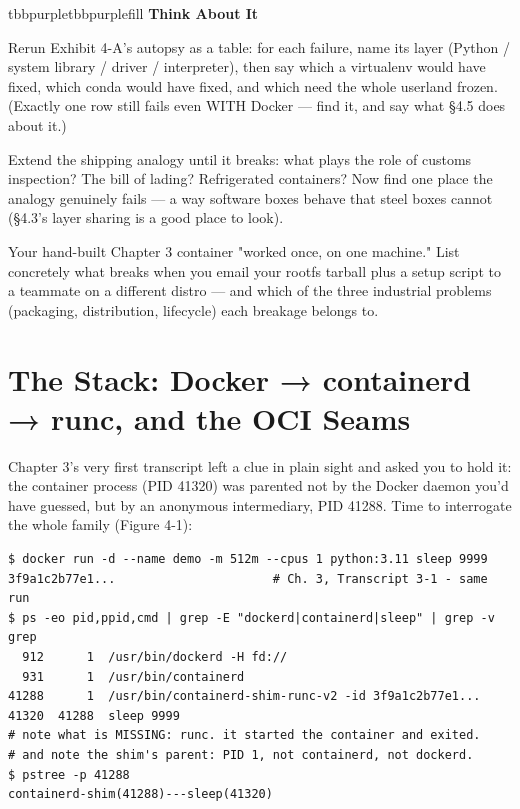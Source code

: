 \begin{calloutbox}{tbbpurple}{tbbpurplefill}
{\normalsize\bfseries\color{tbbpurple}Think About It}\par\vspace{3pt}
\begin{tbbitemize}
  \item Rerun Exhibit 4-A's autopsy as a table: for each failure, name its layer (Python / system library / driver / interpreter), then say which a virtualenv would have fixed, which conda would have fixed, and which need the whole userland frozen. (Exactly one row still fails even WITH Docker — find it, and say what §4.5 does about it.)
  \item Extend the shipping analogy until it breaks: what plays the role of customs inspection? The bill of lading? Refrigerated containers? Now find one place the analogy genuinely fails — a way software boxes behave that steel boxes cannot (§4.3's layer sharing is a good place to look).
  \item Your hand-built Chapter 3 container "worked once, on one machine." List concretely what breaks when you email your rootfs tarball plus a setup script to a teammate on a different distro — and which of the three industrial problems (packaging, distribution, lifecycle) each breakage belongs to.
\end{tbbitemize}
\end{calloutbox}

\section{The Stack: Docker → containerd → runc, and the OCI Seams}

Chapter 3's very first transcript left a clue in plain sight and asked you to hold it: the container process (PID 41320) was parented not by the Docker daemon you'd have guessed, but by an anonymous intermediary, PID 41288. Time to interrogate the whole family (Figure 4-1):

\begin{terminalbox}
\begin{Verbatim}[breaklines=true,breakanywhere=true,fontsize=\small,formatcom=\color{tbbtermfg},codes=\tbbcodeactive]
$ docker run -d --name demo -m 512m --cpus 1 python:3.11 sleep 9999
3f9a1c2b77e1...                      # Ch. 3, Transcript 3-1 - same run
$ ps -eo pid,ppid,cmd | grep -E "dockerd|containerd|sleep" | grep -v grep
  912      1  /usr/bin/dockerd -H fd://
  931      1  /usr/bin/containerd
41288      1  /usr/bin/containerd-shim-runc-v2 -id 3f9a1c2b77e1...
41320  41288  sleep 9999
# note what is MISSING: runc. it started the container and exited.
# and note the shim's parent: PID 1, not containerd, not dockerd.
$ pstree -p 41288
containerd-shim(41288)---sleep(41320)
\end{Verbatim}
\end{terminalbox}


